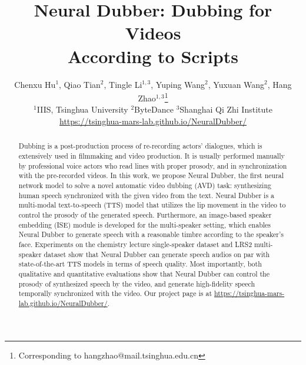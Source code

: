 \documentclass{article}
\title{Neural Dubber: Dubbing for Videos \\According to Scripts}
\author{%
  Chenxu Hu$^{1}$, Qiao Tian$^2$, Tingle Li$^{1,3}$, Yuping Wang$^2$, Yuxuan Wang$^2$, Hang Zhao$^{1,3}$\thanks{Corresponding to hangzhao@mail.tsinghua.edu.cn}\vspace{0.3cm}
\\ \vspace{0.3cm}$^1$IIIS, Tsinghua University \quad $^2$ByteDance \quad $^3$Shanghai Qi Zhi Institute
\\ \url{https://tsinghua-mars-lab.github.io/NeuralDubber/}
}
\newcommand{\tingle}[1]{{\color{blue}{\scriptsize\textbf{Tingle: #1}}}}
\begin{document}
\maketitle

\begin{abstract}
Dubbing is a post-production process of re-recording actors' dialogues, which is extensively used in filmmaking and video production. It is usually performed manually by professional voice actors who read lines with proper prosody, and in synchronization with the pre-recorded videos.
In this work, we propose Neural Dubber, the first neural network model to solve a novel automatic video dubbing (AVD) task: synthesizing human speech synchronized with the given video from the text.
Neural Dubber is a multi-modal text-to-speech (TTS) model that utilizes the lip movement in the video to control the prosody of the generated speech. Furthermore, an image-based speaker embedding (ISE) module is developed for the multi-speaker setting, which enables Neural Dubber to generate speech with a reasonable timbre according to the speaker's face. 
Experiments on the chemistry lecture single-speaker dataset and LRS2 multi-speaker dataset show that Neural Dubber can generate speech audios on par with state-of-the-art TTS models in terms of speech quality. Most importantly, both qualitative and quantitative evaluations show that Neural Dubber can control the prosody of synthesized speech by the video, and generate high-fidelity speech temporally synchronized with the video. Our project page is at \url{https://tsinghua-mars-lab.github.io/NeuralDubber/}.
\end{abstract}
\end{document}

